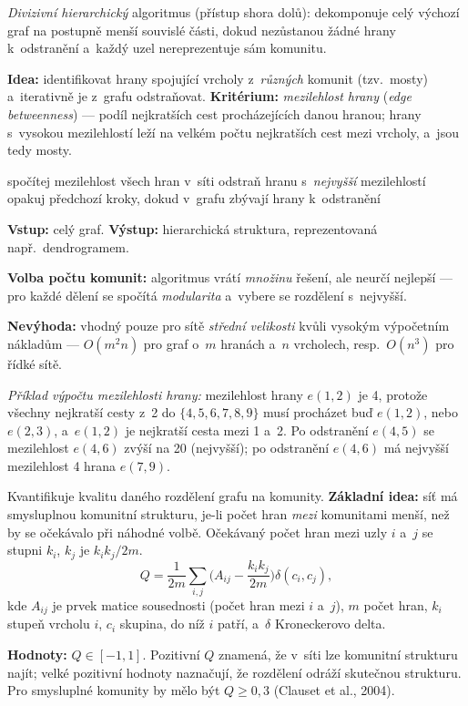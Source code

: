 \documentclass[11pt,a4paper]{article}
\theoremstyle{definition}
\begin{document}
\begin{defbox}
\emph{Divizivní hierarchický} algoritmus (přístup shora dolů): dekomponuje celý výchozí graf
na postupně menší souvislé části, dokud nezůstanou žádné hrany k~odstranění a~každý uzel
nereprezentuje sám komunitu.

\textbf{Idea:} identifikovat hrany spojující vrcholy z~\emph{různých} komunit (tzv.\ mosty)
a~iterativně je z~grafu odstraňovat. \textbf{Kritérium:} \emph{mezilehlost hrany}
(\emph{edge betweenness}) --- podíl nejkratších cest procházejících danou hranou; hrany
s~vysokou mezilehlostí leží na velkém počtu nejkratších cest mezi vrcholy, a~jsou tedy mosty.

\begin{algorithmic}[1]
\State spočítej mezilehlost všech hran v~síti
\State odstraň hranu s~\emph{nejvyšší} mezilehlostí
\State opakuj předchozí kroky, dokud v~grafu zbývají hrany k~odstranění
\end{algorithmic}
\textbf{Vstup:} celý graf. \textbf{Výstup:} hierarchická struktura, reprezentovaná např.\
dendrogramem.

\textbf{Volba počtu komunit:} algoritmus vrátí \emph{množinu} řešení, ale neurčí nejlepší ---
pro každé dělení se spočítá \emph{modularita} a~vybere se rozdělení s~nejvyšší.

\textbf{Nevýhoda:} vhodný pouze pro sítě \emph{střední velikosti} kvůli vysokým výpočetním
nákladům --- $O(m^2n)$ pro graf o~$m$ hranách a~$n$ vrcholech, resp.\ $O(n^3)$ pro řídké sítě.
\end{defbox}

\emph{Příklad výpočtu mezilehlosti hrany:} mezilehlost hrany $e(1,2)$ je 4, protože všechny
nejkratší cesty z~2 do $\{4,5,6,7,8,9\}$ musí procházet buď $e(1,2)$, nebo $e(2,3)$, a~$e(1,2)$
je nejkratší cesta mezi 1 a~2. Po odstranění $e(4,5)$ se mezilehlost $e(4,6)$ zvýší na 20
(nejvyšší); po odstranění $e(4,6)$ má nejvyšší mezilehlost 4 hrana $e(7,9)$.

\begin{defbox}[Modularita $Q$]
Kvantifikuje kvalitu daného rozdělení grafu na komunity. \textbf{Základní idea:} síť má
smysluplnou komunitní strukturu, je-li počet hran \emph{mezi} komunitami menší, než by se
očekávalo při náhodné volbě. Očekávaný počet hran mezi uzly $i$ a~$j$ se stupni $k_i$, $k_j$
je $k_ik_j/2m$.
\[ Q=\frac{1}{2m}\sum_{i,j}\Big(A_{ij}-\frac{k_ik_j}{2m}\Big)\delta(c_i,c_j), \]
kde $A_{ij}$ je prvek matice sousednosti (počet hran mezi $i$ a~$j$), $m$ počet hran, $k_i$
stupeň vrcholu $i$, $c_i$ skupina, do níž $i$ patří, a~$\delta$ Kroneckerovo delta.

\textbf{Hodnoty:} $Q\in[-1,1]$. Pozitivní $Q$ znamená, že v~síti lze komunitní strukturu najít;
velké pozitivní hodnoty naznačují, že rozdělení odráží skutečnou strukturu. Pro smysluplné
komunity by mělo být $Q\ge 0{,}3$ (Clauset et al., 2004).
\end{defbox}
\end{document}
